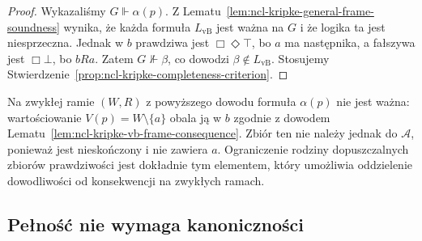 \begin{proof}
Wykazaliśmy $G\Vdash\alpha(p)$.
Z Lematu~\ref{lem:ncl-kripke-general-frame-soundness}
wynika, że każda formuła $L_{\mathrm{vB}}$
jest ważna na $G$ i że logika ta jest
niesprzeczna. Jednak w $b$ prawdziwa jest
$\Box\Diamond\top$, bo $a$ ma następnika,
a fałszywa jest $\Box\bot$, bo $bRa$.
Zatem $G\not\Vdash\beta$, co dowodzi
$\beta\notin L_{\mathrm{vB}}$.
Stosujemy
Stwierdzenie~\ref{prop:ncl-kripke-completeness-criterion}.
\end{proof}

\begin{uwaga}
\label{rem:ncl-kripke-vb-admissibility}
Na zwykłej ramie $(W,R)$ z powyższego dowodu
formuła $\alpha(p)$ nie jest ważna:
wartościowanie $V(p)=W\setminus\{a\}$
obala ją w $b$ zgodnie z dowodem
Lematu~\ref{lem:ncl-kripke-vb-frame-consequence}.
Zbiór ten nie należy jednak do $\mathcal A$,
ponieważ jest nieskończony i nie zawiera $a$.
Ograniczenie rodziny dopuszczalnych zbiorów
prawdziwości jest dokładnie tym elementem,
który umożliwia oddzielenie dowodliwości
od konsekwencji na zwykłych ramach.
\end{uwaga}

\subsection{Pełność nie wymaga kanoniczności}

